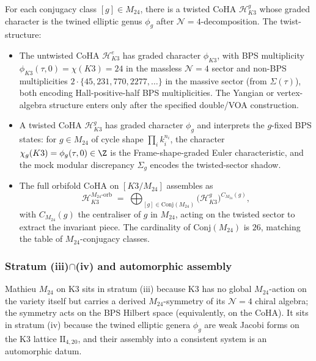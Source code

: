 For each conjugacy class $[g] \in M_{24}$, there is a twisted CoHA $\mathcal{H}_{K3}^g$ whose graded character is the twined elliptic genus $\phi_g$ after $\mathcal{N}=4$-decomposition. The twist-structure:
\begin{itemize}
 \item The untwisted CoHA $\mathcal{H}_{K3}^e$ has graded character $\phi_{K3}$, with BPS multiplicity $\phi_{K3}(\tau, 0) = \chi(K3) = 24$ in the massless $\mathcal{N} = 4$ sector and non-BPS multiplicities $2 \cdot \{45, 231, 770, 2277, \ldots\}$ in the massive sector (from $\Sigma(\tau)$), both encoding Hall-positive-half BPS multiplicities. The Yangian or vertex-algebra structure enters only after the specified double/VOA construction.
 \item A twisted CoHA $\mathcal{H}_{K3}^g$ has graded character $\phi_g$ and interprets the $g$-fixed BPS states: for $g \in M_{24}$ of cycle shape $\prod_i k_i^{n_i}$, the character $\chi_g(K3) = \phi_g(\tau, 0) \in \Z$ is the Frame-shape-graded Euler characteristic, and the mock modular discrepancy $\Sigma_g$ encodes the twisted-sector shadow.
 \item The full orbifold CoHA on $[K3 / M_{24}]$ assembles as
 \[
 \mathcal{H}_{K3}^{M_{24}\text{-orb}} \;=\; \bigoplus_{[g] \in \mathrm{Conj}(M_{24})} \bigl(\mathcal{H}_{K3}^g\bigr)^{C_{M_{24}}(g)},
 \]
 with $C_{M_{24}}(g)$ the centraliser of $g$ in $M_{24}$, acting on the twisted sector to extract the invariant piece. The cardinality of $\mathrm{Conj}(M_{24})$ is $26$, matching the table of $M_{24}$-conjugacy classes.
\end{itemize}

\subsubsection{Stratum (iii)$\cap$(iv) and automorphic assembly}
\label{subsec:m24-strata-overlap}

Mathieu $M_{24}$ on K3 sits in stratum (iii) because K3 has no global $M_{24}$-action on the variety itself but carries a derived $M_{24}$-symmetry of its $\mathcal{N}=4$ chiral algebra; the symmetry acts on the BPS Hilbert space (equivalently, on the CoHA). It sits in stratum (iv) because the twined elliptic genera $\phi_g$ are weak Jacobi forms on the K3 lattice $\mathrm{II}_{4,20}$, and their assembly into a consistent system is an automorphic datum.

